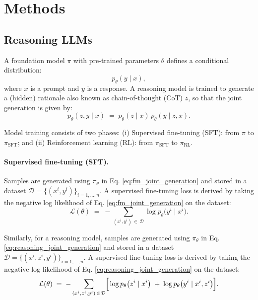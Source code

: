 \section{Methods}

\subsection{Reasoning LLMs}

A foundation model $\pi$ with pre-trained parameters $\theta$ defines a conditional distribution:
\begin{equation}
\label{eq:fm_joint_generation}
p_{\theta}(y \mid x),   
\end{equation}
where $x$ is a prompt and $y$ is a response. A reasoning model is trained to generate a (hidden) rationale also known as chain-of-thought (CoT) $z$, so that the joint generation is given by:
\begin{equation}
\label{eq:reasoning_joint_generation}
    p_{\theta}(z, y \mid x) \;=\; p_{\theta}(z \mid x)\, p_{\theta}(y \mid z, x).
\end{equation}

Model training consists of two phases: (i) Supervised fine-tuning (SFT): from $\pi$ to $\pi_{\text{SFT}}$; and (ii) Reinforcement learning (RL): from $\pi_{\text{SFT}}$ to $\pi_{\text{RL}}$.


\paragraph{Supervised fine-tuning (SFT).}
Samples are generated using $\pi_{\theta}$ in Eq. \ref{eq:fm_joint_generation} and stored in a dataset $\mathcal{D} = \{ (x^i, y^i) \}_{i=1,\ldots,n}$. A supervised fine-tuning loss is derived by taking the negative log likelihood of Eq. \ref{eq:fm_joint_generation} on the dataset:
\begin{equation}
\label{eq:sft_loss}
    \mathcal{L}(\theta) 
    \;=\; - \sum_{(x^i, y^i) \,\in\, \mathcal{D}}
      \log p_\theta\bigl(y^i \mid x^i \bigr).
\end{equation}

Similarly, for a reasoning model, samples are generated using $\pi_{\theta}$ in Eq. \ref{eq:reasoning_joint_generation} and stored in a dataset $\mathcal{D} = \{ (x^i, z^i, y^i) \}_{i=1,\ldots,n}$. A supervised fine-tuning loss is derived by taking the negative log likelihood of Eq. \ref{eq:reasoning_joint_generation} on the dataset:
\begin{equation}
\label{eq:reasoning_sft_loss}
    \mathcal{L}(\theta) 
    \;=\; - \sum_{(x^i, z^i, y^i) \,\in\, \mathcal{D}}
      \Bigl[\,\log p_\theta\bigl(z^i \mid x^i\bigr) \;+\; \log p_\theta\bigl(y^i \mid x^i, z^i\bigr)\Bigr].
\end{equation}

